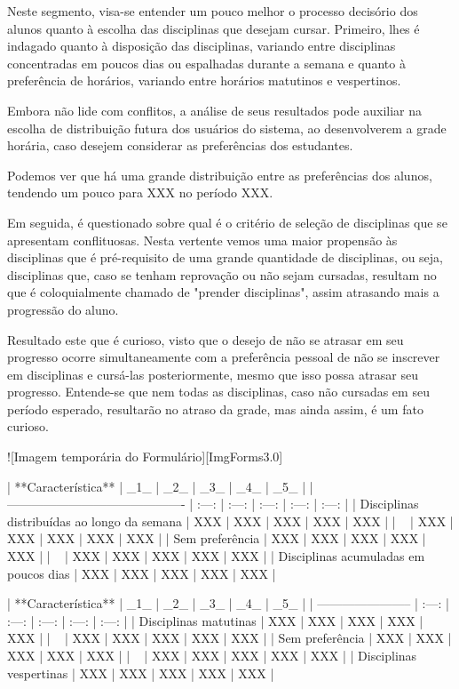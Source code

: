         Neste segmento, visa-se entender um pouco melhor o processo decisório dos alunos quanto à escolha das disciplinas que desejam cursar. Primeiro, lhes é indagado quanto à disposição das disciplinas, variando entre disciplinas concentradas em poucos dias ou espalhadas durante a semana e quanto à preferência de horários, variando entre horários matutinos e vespertinos.

        Embora não lide com conflitos, a análise de seus resultados pode auxiliar na escolha de distribuição futura dos usuários do sistema, ao desenvolverem a grade horária, caso desejem considerar as preferências dos estudantes.

        Podemos ver que há uma grande distribuição entre as preferências dos alunos, tendendo um pouco para XXX no período XXX.

        Em seguida, é questionado sobre qual é o critério de seleção de disciplinas que se apresentam conflituosas. Nesta vertente vemos uma maior propensão às disciplinas que é pré-requisito de uma grande quantidade de disciplinas, ou seja, disciplinas que, caso se tenham reprovação ou não sejam cursadas, resultam no que é coloquialmente chamado de "prender disciplinas", assim atrasando mais a progressão do aluno.

        Resultado este que é curioso, visto que o desejo de não se atrasar em seu progresso ocorre simultaneamente com a preferência pessoal de não se inscrever em disciplinas e cursá-las posteriormente, mesmo que isso possa atrasar seu progresso. Entende-se que nem todas as disciplinas, caso não cursadas em seu período esperado, resultarão no atraso da grade, mas ainda assim, é um fato curioso.

        ![Imagem temporária do Formulário][ImgForms3.0]

        | **Característica**                          |  _1_  |  _2_  |  _3_  |  _4_  |  _5_  |
        | ------------------------------------------- | :---: | :---: | :---: | :---: | :---: |
        | Disciplinas distribuídas ao longo da semana |  XXX  |  XXX  |  XXX  |  XXX  |  XXX  |
        | ~                                           |  XXX  |  XXX  |  XXX  |  XXX  |  XXX  |
        | Sem preferência                             |  XXX  |  XXX  |  XXX  |  XXX  |  XXX  |
        | ~                                           |  XXX  |  XXX  |  XXX  |  XXX  |  XXX  |
        | Disciplinas acumuladas em poucos dias       |  XXX  |  XXX  |  XXX  |  XXX  |  XXX  |

        | **Característica**      |  _1_  |  _2_  |  _3_  |  _4_  |  _5_  |
        | ----------------------- | :---: | :---: | :---: | :---: | :---: |
        | Disciplinas matutinas   |  XXX  |  XXX  |  XXX  |  XXX  |  XXX  |
        | ~                       |  XXX  |  XXX  |  XXX  |  XXX  |  XXX  |
        | Sem preferência         |  XXX  |  XXX  |  XXX  |  XXX  |  XXX  |
        | ~                       |  XXX  |  XXX  |  XXX  |  XXX  |  XXX  |
        | Disciplinas vespertinas |  XXX  |  XXX  |  XXX  |  XXX  |  XXX  |

